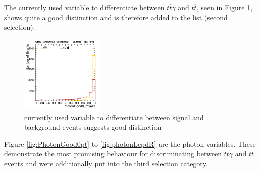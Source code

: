 \documentclass[11pt]{scrartcl}
\begin{document}
\newpage
The currently used variable to differentiate between $t\overline{t}\gamma$ and $t\overline{t}$, seen in Figure \ref{fig:PhotonGood0mvaID}, shows quite a good distinction and is therefore added to the list (second selection).

	\begin{figure}[H]
	\centering
	\includegraphics[width=0.35\textwidth]{figures/Select2/PhotonGood0_mvaID.png}
	\caption{currently used variable to differentiate between signal and background events suggests good distinction}
 	\label{fig:PhotonGood0mvaID}
	\end{figure}
	
Figure \ref{fig:PhotonGood0pt} to \ref{fig:photonLepdR} are the photon variables. These demonstrate the most promising behaviour for discriminating between $t\overline{t}\gamma$ and $t\overline{t}$ events and were additionally put into the third selection category.
\end{document}
